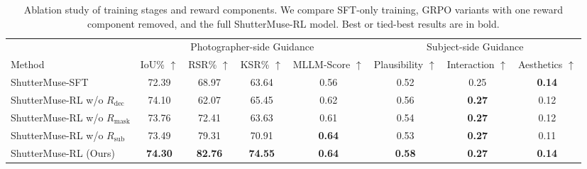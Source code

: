 \documentclass{llmxive}
\providecommand{\arraystretch}{1}
\begin{document}
\begin{table}[!t]
\centering
\small
\setlength{\tabcolsep}{5pt}
\renewcommand{\arraystretch}{1.05}
\begin{adjustbox}{max width=\textwidth}
\begin{tabular}{lccccccc}
\toprule
& \multicolumn{4}{c}{Photographer-side Guidance} 
& \multicolumn{3}{c}{Subject-side Guidance} \\
\cmidrule(lr){2-5} \cmidrule(lr){6-8}
Method
& IoU\% $\uparrow$ 
& RSR\% $\uparrow$ 
& KSR\% $\uparrow$ 
& MLLM-Score $\uparrow$ 
& Plausibility $\uparrow$ 
& Interaction $\uparrow$ 
& Aesthetics $\uparrow$ \\
\midrule
ShutterMuse-SFT
& 72.39 & 68.97 & 63.64 & 0.56 & 0.52 & 0.25 & \textbf{0.14} \\
\midrule
ShutterMuse-RL w/o $R_{\mathrm{dec}}$
& 74.10 & 62.07 & 65.45 & 0.62 & 0.56 & \textbf{0.27} & 0.12 \\
ShutterMuse-RL w/o $R_{\mathrm{mask}}$
& 73.76 & 72.41 & 63.63 & 0.61 & 0.54 & \textbf{0.27} & 0.12 \\
ShutterMuse-RL w/o $R_{\mathrm{sub}}$
& 73.49 & 79.31 & 70.91 & \textbf{0.64} & 0.53 & \textbf{0.27} & 0.11 \\
\rowcolor{myblue}
ShutterMuse-RL (Ours)
& \textbf{74.30} & \textbf{82.76} & \textbf{74.55} & \textbf{0.64} 
& \textbf{0.58} & \textbf{0.27} & \textbf{0.14} \\
\bottomrule
\end{tabular}
\end{adjustbox}
\caption{
Ablation study of training stages and reward components. We compare SFT-only training,
GRPO variants with one reward component removed, and the full ShutterMuse-RL model.
Best or tied-best results are in bold.
}
\label{tab:ablation}
\end{table}
\end{document}
